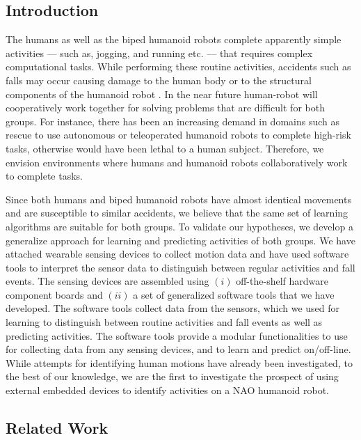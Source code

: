 \documentclass[letterpaper]{article}
\begin{document}
\begin{sloppy}
\section{Introduction}
\label{sec:Intro}
The humans as well as the biped humanoid robots complete apparently simple activities --- such as, jogging, and running etc. --- that requires 
complex computational tasks. While performing these routine 
activities, accidents such as falls may occur causing damage to the human body or to the structural 
components of the humanoid robot \cite{li2009accurate}. In the near future human-robot will cooperatively work together for solving problems that are difficult for both groups.  For instance, there has been an increasing demand in 
domains such as rescue to use autonomous or teleoperated humanoid robots to complete high-risk 
tasks, otherwise would have been lethal to a human subject. Therefore, we envision environments 
where humans and humanoid robots collaboratively work to complete tasks. 

Since both humans and biped humanoid robots have almost identical movements and are susceptible to 
similar accidents, we believe that the same set of learning algorithms are suitable for both 
groups. To validate our hypotheses, we develop a generalize approach for learning 
and predicting activities of both groups.  We have attached wearable sensing devices to collect 
motion data and have used software tools to interpret the sensor data to distinguish 
between regular activities and fall events. The sensing devices are assembled using $(i)$ off-the-shelf 
hardware component boards and $(ii)$  a set of generalized software tools that we have developed. The software tools 
collect data  from the sensors, which we used for learning to distinguish between routine activities and fall events as well as predicting activities. The software tools provide a modular 
functionalities to use for collecting  data from any sensing devices, and to learn and predict 
on/off-line. While attempts for identifying human motions have already been investigated, to the 
best of our knowledge, we are the first to investigate the prospect of using external embedded 
devices to identify activities on a NAO humanoid robot. 



\subsection{Related Work}


\end{sloppy}
\end{document}
